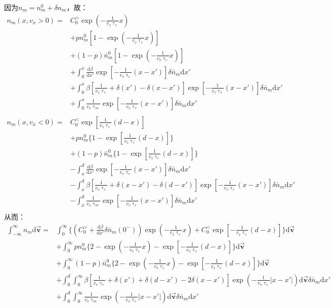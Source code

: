 \documentclass{article}
\begin{document}
	因为$n_m=n_m^0+\delta n_m$，故：
	\begin{equation}\label{eq:6}
	\begin{aligned}
		 n_m(x,v_x>0)=&C_0^>\exp(-\frac{1}{v_x\uptau_c}x)\\
			&+pn^0_m[1-\exp(-\frac{1}{v_x\uptau_c}x)]\\
			&+(1-p)\bar{n}^0_m[1-\exp(-\frac{1}{v_x\uptau_c}x)]\\
			&+\int_0^x\frac{\mathrm{d}\beta}{\mathrm{d}x'}\exp[-\frac{1}{v_x\uptau_{c}}(x-x')]\delta\bar{n}_m\mathrm{d}x'\\
			&+\int_0^x\beta[\frac{1}{v_x\uptau_c}+\delta(x')-\delta(x-x')]\exp[-\frac{1}{v_x\uptau_{c}}(x-x')]\delta\bar{n}_m\mathrm{d}x'\\
			&+\int_0^x\frac{1}{v_x\uptau_m}\exp[-\frac{1}{v_x\uptau_{c}}(x-x')]\delta\bar{n}_m\mathrm{d}x'\\
	\end{aligned}
	\end{equation}
	\begin{equation}\label{eq:7}
	\begin{aligned}
		n_m(x,v_x<0)=&C_0^<\exp[\frac{1}{v_x\uptau_c}(d-x)]\\
			&+pn^0_m\{1-\exp[\frac{1}{v_x\uptau_c}(d-x)]\}\\
			&+(1-p)\bar{n}^0_m\{1-\exp[\frac{1}{v_x\uptau_c}(d-x)]\}\\
			&-\int_x^d\frac{\mathrm{d}\beta}{\mathrm{d}x'}\exp[-\frac{1}{v_x\uptau_{c}}(x-x')]\delta\bar{n}_m\mathrm{d}x'\\
			&-\int_x^d\beta[\frac{1}{v_x\uptau_c}+\delta(x-x')-\delta(d-x')]\exp[-\frac{1}{v_x\uptau_{c}}(x-x')]\delta\bar{n}_m\mathrm{d}x'\\
			&-\int_x^d\frac{1}{v_x\uptau_m}\exp[-\frac{1}{v_x\uptau_{c}}(x-x')]\delta\bar{n}_m\mathrm{d}x'\\
	\end{aligned}
	\end{equation}
	从而：
	\begin{equation}\label{eq:8}
		\begin{aligned}
			\int_{-\infty}^{\infty}n_m\mathrm{d}\vec{\textbf{v}}=&\int_0^\infty \{(C_0^>+\frac{\mathrm{d}\beta}{\mathrm{d}x'}\delta\bar{n}_m(0^-))\exp(-\frac{1}{v_x\uptau_c}x)+C_0^<\exp[-\frac{1}{v_x\uptau_c}(d-x)]\}\mathrm{d}\vec{\textbf{v}}\\
			&+\int_0^\infty pn^0_m\{2-\exp(-\frac{1}{v_x\uptau_c}x)-\exp[-\frac{1}{v_x\uptau_c}(d-x)]\}\mathrm{d}\vec{\textbf{v}}\\
			&+\int_0^\infty (1-p)\bar{n}^0_m\{2-\exp(-\frac{1}{v_x\uptau_c}x)-\exp[-\frac{1}{v_x\uptau_c}(d-x)]\}\mathrm{d}\vec{\textbf{v}}\\
			&+\int_0^d\int_0^\infty\beta[\frac{1}{v_x\uptau_c}+\delta(x')+\delta(d-x')-2\delta(x-x')]\exp(-\frac{1}{v_x\uptau_{c}}|x-x'|)\mathrm{d}\vec{\textbf{v}}\delta\bar{n}_m\mathrm{d}x'\\
			&+\int_0^d\int_0^\infty\frac{1}{v_x\uptau_m}\exp(-\frac{1}{v_x\uptau_{c}}|x-x'|)\mathrm{d}\vec{\textbf{v}}\delta\bar{n}_m\mathrm{d}x'\\
		\end{aligned}
	\end{equation}
\end{document}
